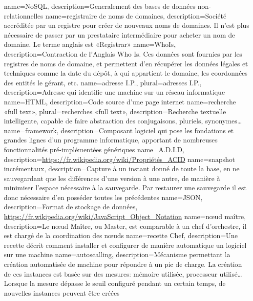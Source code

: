 {
  name=NoSQL,
  description={Generalement des bases de données non-relationnelles}
}
{
  name=registraire de noms de domaines,
  description={Société accréditée par un registre pour créer de nouveaux noms de domaines. Il n'est plus nécessaire de passer par un prestataire intermédiaire pour acheter un nom de domaine. Le terme anglais est «Registrar»}
}
{
  name=WhoIs,
  description={Contraction de l'Anglais Who Is.
     Ces données sont fournies par les registres de noms de domaine, et permettent d'en récupérer les données légales et techniques comme la date du dépôt, à qui appartient le domaine, les coordonnées des entités le gérant, etc.}
}
{
  name=adresse I.P.,
  plural=adresses I.P.,
  description=Adresse qui identifie une machine sur un réseau informatique
}
{
  name=HTML,
  description=Code source d'une page internet
}
{
  name=recherche «full text»,
  plural=recherches «full text»,
  description={Recherche textuelle intelligente, capable de faire abstraction des conjugaisons, pluriels, synonymes…}
}
{
  name=framework,
  description={Composant logiciel qui pose les fondations et grandes lignes d'un programme informatique, apportant de nombreuses fonctionnalités pré-implémentées génériques}
}
{
  name=A.D.I.D,
  description={\url{https://fr.wikipedia.org/wiki/Propriétés_ACID}}
}
{
  name=snapshot incrémentaux,
  description={Capture à un instant donné de toute la base, en ne sauvegardant que les différences d'une version à une autre, de manière à minimiser l'espace nécessaire à la sauvegarde. Par restaurer une sauvegarde il est donc nécessaire d'en posséder toutes les précédentes}
}
{
  name=JSON,
  description={Format de stockage de données, \url{https://fr.wikipedia.org/wiki/JavaScript_Object_Notation}}
}
{
  name=nœud maître,
  description={Le nœud Maître, ou Master, est comparable à un chef d'orchestre, il est chargé de la coordination des nœuds}
}
{
  name=recette Chef,
  description={Une recette décrit comment installer et configurer de manière automatique un logiciel sur une machine}
}
{
  name=autoscalling,
  description={Mécanisme permettant la création automatisée de machine pour répondre à un pic de charge. La création de ces instances est basée sur des mesures: mémoire utilisée, processeur utilisé… Lorsque la mesure dépasse le seuil configuré pendant un certain temps, de nouvelles instances peuvent être créées}
}
